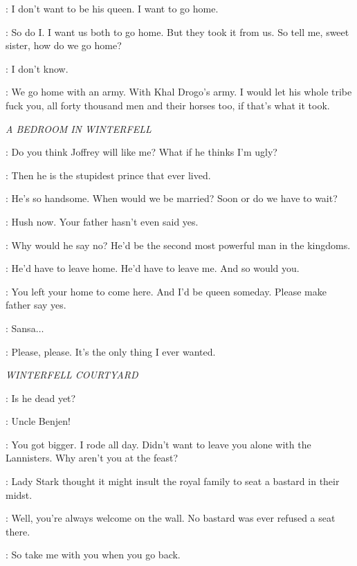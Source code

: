 \DAENERYS: I don't want to be his queen. I want to go home. 

\VISERYS: So do I. I want us both to go home. But they took it from us. So tell me, sweet sister, how do we go home? 

\DAENERYS: I don't know. 

\VISERYS: We go home with an army. With Khal Drogo's army. I would let his whole tribe fuck you, all forty thousand men and their horses too, if that's what it took. 


\scene

\textit{A BEDROOM IN WINTERFELL} 


\SANSA: Do you think Joffrey will like me? What if he thinks I'm ugly? 

\CATELYN: Then he is the stupidest prince that ever lived. 

\SANSA: He's so handsome. When would we be married? Soon or do we have to wait? 

\CATELYN: Hush now. Your father hasn't even said yes. 

\SANSA: Why would he say no? He'd be the second most powerful man in the kingdoms. 

\CATELYN: He'd have to leave home. He'd have to leave me. And so would you. 

\SANSA: You left your home to come here. And I'd be queen someday. Please make father say yes. 

\CATELYN: Sansa$\ldots$ 

\SANSA: Please, please. It's the only thing I ever wanted. 


\scene

\textit{WINTERFELL COURTYARD} 


\BENJEN: Is he dead yet? 

\JON: Uncle Benjen! 


\BENJEN: You got bigger. I rode all day. Didn't want to leave you alone with the Lannisters. Why aren't you at the feast? 

\JON: Lady Stark thought it might insult the royal family to seat a bastard in their midst. 

\BENJEN: Well, you're always welcome on the wall. No bastard was ever refused a seat there. 

\JON: So take me with you when you go back. 

